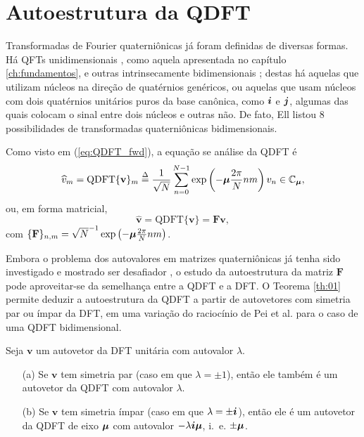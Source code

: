\section{Autoestrutura da QDFT}
\label{sec:autoestrutura}
Transformadas de Fourier quaterni\^onicas j\'a foram definidas de diversas formas. H\'a QFTs unidimensionais \cite{flamant2017spectral}, como aquela apresentada no cap\'itulo \ref{ch:fundamentos}, e outras intrinsecamente bidimensionais \cite{guanlei2008fractional}; destas h\'a aquelas que utilizam n\'ucleos na dire\c c\~ao de quat\'ernios gen\'ericos, ou aquelas que usam n\'ucleos com dois quat\'ernios unit\'arios puros da base can\^onica, como $ \boldsymbol{i} $ e $ \boldsymbol{j} $, algumas das quais colocam o sinal entre dois n\'ucleos e outras n\~ao. De fato, Ell \cite[sec. 3.2]{ell2014quaternion} listou 8 possibilidades de transformadas quaterni\^onicas bidimensionais.

Como visto em (\ref{eq:QDFT_fwd}), a equa\c c\~ao se an\'alise da QDFT \'e
\begin{equation}
\widehat{v}_m = \text{QDFT}\{ \mathbf{v} \}_m \overset{\Delta}{=} \frac{1}{\sqrt{N}} \sum_{n=0}^{N-1}  \exp \left( -\boldsymbol{\mu} \frac{2\pi}{N} nm \right) v_n \in \mathbb{C}_{\boldsymbol{\mu}},
\end{equation}
ou, em forma matricial,
\begin{equation}
\widehat{\mathbf{v}} = \text{QDFT}\{ \mathbf{v} \} = \mathbf{F} \mathbf{v},
\end{equation}
com $ \{\mathbf{F}\}_{n,m} = \sqrt{N}^{-1} \exp \left( -\boldsymbol{\mu} \frac{2\pi}{N} nm \right)$.

Embora o problema dos autovalores em matrizes quaterni\^onicas j\'a tenha sido investigado e mostrado ser desafiador \cite{de2002quaternionic,flaut2002eigenvalues,jiang2004algorithm,farid2011eigenvalues}, o estudo da autoestrutura da matriz $ \mathbf{F} $ pode aproveitar-se da semelhan\c ca entre a QDFT e a DFT. O Teorema \ref{th:01} permite deduzir a autoestrutura da QDFT a partir de autovetores com simetria par ou \'impar da DFT, em uma varia\c c\~ao do racioc\'inio de Pei et al. \cite{pei2010eigenfunctions} para o caso de uma QDFT bidimensional.

\begin{theorem}
	\label{th:01}
	Seja $ \mathbf{v} $ um autovetor da DFT unit\'aria com autovalor $ \lambda $.
	\begin{itemize}[noitemsep]
		\item[(a)] Se $ \mathbf{v} $ tem simetria par (caso em que $ \lambda = \pm 1 $), ent\~ao ele tamb\'em \'e um autovetor da QDFT com autovalor $ \lambda $.
		\item[(b)] Se $ \mathbf{v} $ tem simetria \'impar (caso em que $ \lambda = \pm \boldsymbol{i} $), ent\~ao ele \'e um autovetor da QDFT de eixo $ \boldsymbol{\mu} $ com autovalor $ -\lambda \boldsymbol{i} \boldsymbol{\mu}$, i.~e. $ \pm \boldsymbol{\mu} $.
	\end{itemize}
\end{theorem}

